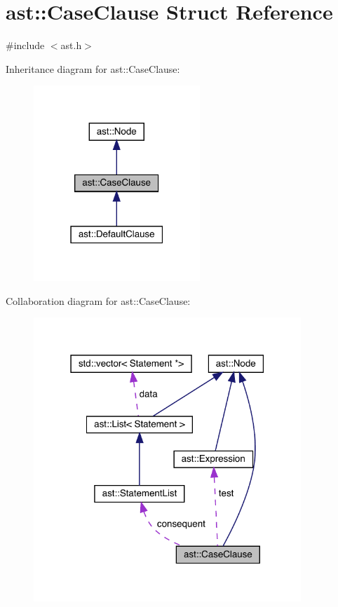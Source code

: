 \hypertarget{structast_1_1_case_clause}{}\section{ast\+:\+:Case\+Clause Struct Reference}
\label{structast_1_1_case_clause}


{\ttfamily \#include $<$ast.\+h$>$}



Inheritance diagram for ast\+:\+:Case\+Clause\+:
\nopagebreak
\begin{figure}[H]
\begin{center}
\leavevmode
\includegraphics[width=178pt]{structast_1_1_case_clause__inherit__graph}
\end{center}
\end{figure}


Collaboration diagram for ast\+:\+:Case\+Clause\+:
\nopagebreak
\begin{figure}[H]
\begin{center}
\leavevmode
\includegraphics[width=286pt]{structast_1_1_case_clause__coll__graph}
\end{center}
\end{figure}
